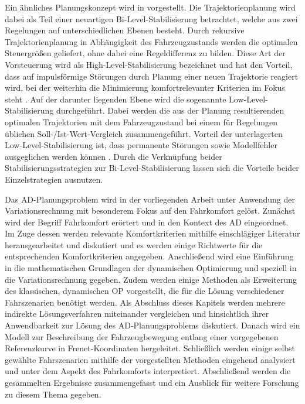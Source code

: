 Ein ähnliches Planungskonzept wird in \cite{Werling.2011} vorgestellt. Die Trajektorienplanung wird dabei als Teil einer neuartigen Bi-Level-Stabilisierung betrachtet, welche aus zwei Regelungen auf unterschiedlichen Ebenen besteht. Durch rekursive Trajektorienplanung in Abhängigkeit des Fahrzeugzustands werden die optimalen Steuergrößen geliefert, ohne dabei eine Regeldifferenz zu bilden. Diese Art der Vorsteuerung wird als High-Level-Stabilisierung bezeichnet und hat den Vorteil, dass auf impulsförmige Störungen durch Planung einer neuen Trajektorie reagiert wird, bei der weiterhin die Minimierung komfortrelevanter Kriterien im Fokus steht \cite{Werling.2011}. Auf der darunter liegenden Ebene wird die sogenannte Low-Level-Stabilisierung durchgeführt. Dabei werden die aus der Planung resultierenden optimalen Trajektorien mit dem Fahrzeugzustand bei einem für Regelungen üblichen Soll-/Ist-Wert-Vergleich zusammengeführt. Vorteil der unterlagerten Low-Level-Stabilisierung ist, dass permanente Störungen sowie Modellfehler ausgeglichen werden können \cite{Werling.2011}. Durch die Verknüpfung beider Stabilisierungsstrategien zur Bi-Level-Stabilisierung lassen sich die Vorteile beider Einzelstrategien ausnutzen.   

Das \gls{AD}-Planungsproblem wird in der vorliegenden Arbeit unter Anwendung der Variationsrechnung mit besonderem Fokus auf den Fahrkomfort gelöst. Zunächst wird der Begriff Fahrkomfort erörtert und in den Kontext des \gls{AD} eingeordnet. Im Zuge dessen werden relevante Komfortkriterien mithilfe einschlägiger Literatur herausgearbeitet und diskutiert und es werden einige Richtwerte für die entsprechenden Komfortkriterien angegeben. Anschließend wird eine Einführung in die mathematischen Grundlagen der dynamischen Optimierung und speziell in die Variationsrechnung gegeben. Zudem werden einige Methoden als Erweiterung des \glqq klassischen\grqq, dynamischen \gls{OP} vorgestellt, die für die Lösung verschiedener Fahrszenarien benötigt werden. Als Abschluss dieses Kapitels werden mehrere indirekte Lösungsverfahren miteinander vergleichen und hinsichtlich ihrer Anwendbarkeit zur Lösung des \gls{AD}-Planungsproblems diskutiert. Danach wird ein Modell zur Beschreibung der Fahrzeugbewegung entlang einer vorgegebenen Referenzkurve in Frenet-Koordinaten hergeleitet. Schließlich werden einige selbst gewählte Fahrszenarien mithilfe der vorgestellten Methoden eingehend analysiert und unter dem Aspekt des Fahrkomforts interpretiert. Abschließend werden die gesammelten Ergebnisse zusammengefasst und ein Ausblick für weitere Forschung zu diesem Thema gegeben. 

